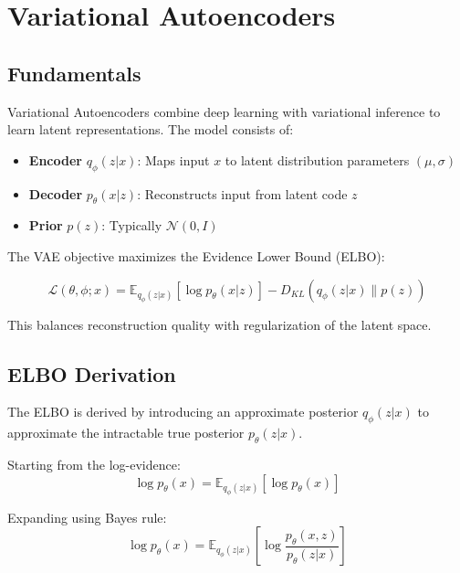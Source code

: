 \documentclass[conference]{IEEEtran}
\begin{document}
\section{Variational Autoencoders}

\subsection{Fundamentals}

Variational Autoencoders combine deep learning with variational inference to learn latent representations. The model consists of:

\begin{itemize}
    \item \textbf{Encoder} $q_\phi(z|x)$: Maps input $x$ to latent distribution parameters $(\mu, \sigma)$
    \item \textbf{Decoder} $p_\theta(x|z)$: Reconstructs input from latent code $z$
    \item \textbf{Prior} $p(z)$: Typically $\mathcal{N}(0, I)$
\end{itemize}

The VAE objective maximizes the Evidence Lower Bound (ELBO):

\begin{equation}
\mathcal{L}(\theta, \phi; x) = \mathbb{E}_{q_\phi(z|x)} \left[ \log p_\theta(x|z) \right] - D_{KL}(q_\phi(z|x) \| p(z))
\label{eq:elbo}
\end{equation}

This balances reconstruction quality with regularization of the latent space.

\subsection{ELBO Derivation}

The ELBO is derived by introducing an approximate posterior $q_\phi(z|x)$ to approximate the intractable true posterior $p_\theta(z|x)$.

Starting from the log-evidence:
\begin{equation}
\log p_\theta(x) = \mathbb{E}_{q_\phi(z|x)} \left[ \log p_\theta(x) \right]
\end{equation}

Expanding using Bayes rule:
\begin{equation}
\log p_\theta(x) = \mathbb{E}_{q_\phi(z|x)} \left[ \log \frac{p_\theta(x, z)}{p_\theta(z|x)} \right]
\end{equation}
\end{document}
